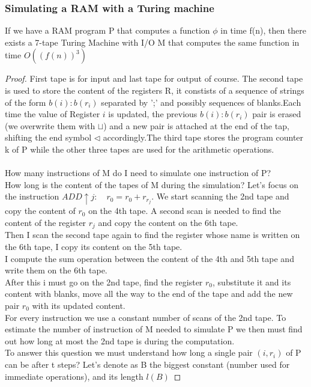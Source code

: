 \subsubsection{Simulating a RAM with a Turing machine}
\begin{theorem}
    If we have a RAM program P that computes a function $\phi$ in time f(n), then there exists a 7-tape Turing Machine with I/O M that computes the same function in time $O((f(n))^3)$
    \begin{proof}
        First tape is for input and last tape for output of course. The second tape is used to store the content of the registers R, it constists of a sequence of strings of the form $b(i):b(r_i)$ separated by ';' and possibly sequences of blanks.Each time the value of Register $i$ is updated, the previous $b(i):b(r_i)$ pair is erased (we overwrite them with $\sqcup$) and a new pair is attached at the end of the tap, shifting the end symbol $\triangleleft$ accordingly.The third tape stores the program counter k of P while the other three tapes are used for the arithmetic operations.\\\\
        How many instructions of M do I need to simulate one instruction of P?\\
        How long is the content of the tapes of M during the simulation?\newline
        Let's focus on the instruction $ADD \uparrow j: \quad r_0 = r_0+r_{r_j}$. We start scanning the 2nd tape and copy the content of $r_0$ on the 4th tape. A second scan is needed to find the content of the register $r_j$ and copy the content on the 6th tape.\\
        Then I scan the second tape again to find the register whose name is written on the 6th tape, I copy its content on the 5th tape.\\ I compute the sum operation between the content of the 4th and 5th tape and write them on the 6th tape.\\
        After this i must go on the 2nd tape, find the register $r_0$, substitute it and its content with blanks, move all the way to the end of the tape and add the new pair $r_0$ with its updated content.\\
        For every instruction we use a constant number of scans of the 2nd tape. To estimate the number of instruction of M needed to simulate P we then must find out how long at most the 2nd tape is during the computation.\\ To answer this question we must understand how long a single pair $(i,r_i)$ of P can be after t steps? Let's denote as B the biggest constant (number used for immediate operations), and its length $l(B)$

\end{proof}
\end{theorem}
